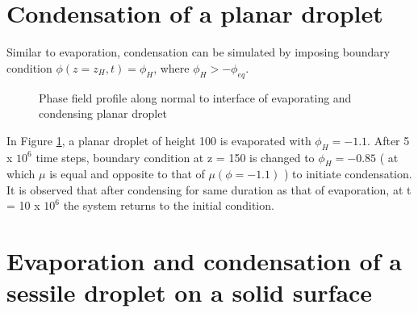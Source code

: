\documentclass[11pt]{article}
\begin{document}
\section{Condensation of a planar droplet}
Similar to evaporation, condensation can be simulated by imposing boundary condition $\phi(z=z_{H},t)=\phi_{H}$, where $\phi_{H} > -\phi_{eq}$.
\begin{figure}[h!]
	\begin{center}
		\caption{Phase field profile along normal to interface of evaporating and condensing planar droplet}
		\label{fig:evap_cond_1D}
	\end{center}
	
\end{figure}
In Figure \ref*{fig:evap_cond_1D}, a planar droplet of height 100 is evaporated with $\phi_{H} = -1.1$. After 5 x $10^{6}$ time steps, boundary condition at z = 150 is changed to $\phi_{H} = -0.85$ ( at which $\mu$ is equal and opposite to that of $\mu(\phi=-1.1)$ ) to initiate condensation. It is observed that after condensing for same duration as that of evaporation, at t = 10 x $10^{6}$ the system returns to the initial condition. 

\section{Evaporation and condensation of a sessile droplet on a solid surface}
\end{document}
